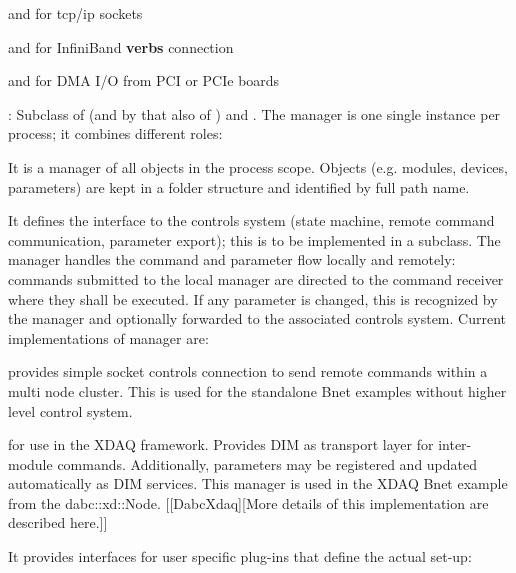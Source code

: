 \begin{description}
\begin{compactitem}[$\bullet$]
\item {} and  for tcp/ip sockets
\item {} and  for InfiniBand {\bf verbs} connection
\item {} and  for DMA I/O from PCI or PCIe boards  
\end{compactitem}
\item[\class{dabc::Manager}] : Subclass of  (and by that also of ) 
   and . The manager is one single instance per process; 
   it combines different roles: 
\begin{compactenum}
      \item It is a manager of all  objects in the process scope. 
      Objects (e.g. modules, devices, parameters) are kept 
      in a folder structure and identified by full path name. 
      \item It defines the interface to the controls system (state machine, 
      remote command communication, parameter export); this is to be implemented 
      in a subclass. The manager handles the command and parameter flow 
      locally and remotely: commands submitted to the local manager are 
      directed to the command receiver where they shall be executed. 
      If any parameter is changed, this is recognized by the manager 
      and optionally forwarded to the associated controls system. Current 
      implementations of manager are:
\begin{compactitem}[$\bullet$]
   \item {} provides simple socket controls connection to 
	 send remote commands within a multi node cluster. This is used for the 
	 standalone Bnet examples without higher level control system.
   \item {} for use in the XDAQ framework. Provides DIM as 
	 transport layer for inter-module commands. Additionally, 
	 parameters may be registered and updated automatically as 
	 DIM services. This manager is used in the XDAQ Bnet example 
	 from the dabc::xd::Node. [[DabcXdaq][More details of this 
	 implementation are described here.]]
\end{compactitem}
      \item It provides interfaces for user specific plug-ins that define 
      the actual set-up: \\

\end{compactenum}
\end{description}
